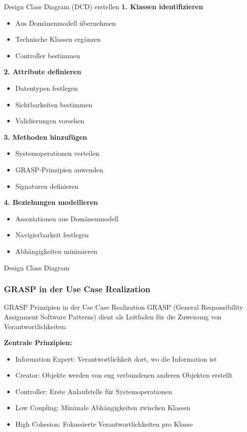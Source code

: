 \begin{KR}{Design Class Diagram (DCD) erstellen}
\textbf{1. Klassen identifizieren}
\begin{itemize}
    \item Aus Domänenmodell übernehmen
    \item Technische Klassen ergänzen
    \item Controller bestimmen
\end{itemize}

\textbf{2. Attribute definieren}
\begin{itemize}
    \item Datentypen festlegen
    \item Sichtbarkeiten bestimmen
    \item Validierungen vorsehen
\end{itemize}

\textbf{3. Methoden hinzufügen}
\begin{itemize}
    \item Systemoperationen verteilen
    \item GRASP-Prinzipien anwenden
    \item Signaturen definieren
\end{itemize}

\textbf{4. Beziehungen modellieren}
\begin{itemize}
    \item Assoziationen aus Domänenmodell
    \item Navigierbarkeit festlegen
    \item Abhängigkeiten minimieren
\end{itemize}
\end{KR}

\begin{example2}{Design Class Diagram}
\end{example2}

\columnbreak

\subsubsection{GRASP in der Use Case Realization}

\begin{concept}{GRASP Prinzipien in der Use Case Realization}
GRASP (General Responsibility Assignment Software Patterns) dient als Leitfaden für die Zuweisung von Verantwortlichkeiten:

\textbf{Zentrale Prinzipien:}
\begin{itemize}
    \item Information Expert: Verantwortlichkeit dort, wo die Information ist
    \item Creator: Objekte werden von eng verbundenen anderen Objekten erstellt
    \item Controller: Erste Anlaufstelle für Systemoperationen
    \item Low Coupling: Minimale Abhängigkeiten zwischen Klassen
    \item High Cohesion: Fokussierte Verantwortlichkeiten pro Klasse
\end{itemize}
\end{concept}

